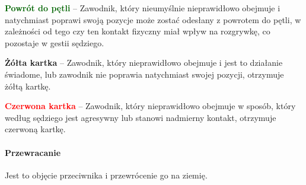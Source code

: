 \documentclass[12pt]{article}
\newcommand\redcard[1]{\bgroup\textcolor{red}{\textbf{#1}}}
\newcommand\yellowcard[1]{\bgroup\textcolor{darkyellow}{\textbf{#1}}}
\newcommand\other[1]{\bgroup\textcolor{darkgreen}{\textbf{#1}}}
\begin{document}
\other{Powrót do pętli} -- Zawodnik, który nieumyślnie nieprawidłowo
obejmuje i natychmiast poprawi swoją pozycje może zostać odesłany z
powrotem do pętli, w zależności od tego czy ten kontakt fizyczny miał
wpływ na rozgrywkę, co pozostaje w gestii sędziego.

\yellowcard{Żółta kartka} -- Zawodnik, który nieprawidłowo obejmuje i jest to
działanie świadome, lub zawodnik nie poprawia natychmiast swojej
pozycji, otrzymuje żółtą kartkę.

\redcard{Czerwona kartka} -- Zawodnik, który nieprawidłowo obejmuje w
sposób, który według sędziego jest agresywny lub stanowi nadmierny
kontakt, otrzymuje czerwoną kartkę.

\paragraph{Przewracanie}
Jest to objęcie przeciwnika i
przewrócenie go na ziemię.
\end{document}
